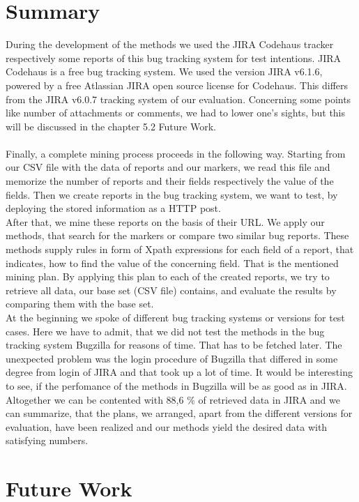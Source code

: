\section{Summary}
\label{Summary}
During the development of the methods we used the JIRA Codehaus tracker respectively some reports of this bug tracking system for test intentions. JIRA Codehaus is a free bug tracking system. We used the version JIRA v6.1.6, powered by a free Atlassian JIRA open source license for Codehaus. This differs from the JIRA v6.0.7 tracking system of our evaluation. Concerning some points like number of attachments or comments, we had to lower one's sights, but this will be discussed in the chapter 5.2 Future Work. \\ \\
Finally, a complete mining process proceeds in the following way.
Starting from our CSV file with the data of reports and our markers, we read this file and memorize the number of reports and their fields respectively the value of the fields. Then we create reports in the bug tracking system, we want to test, by deploying the stored information as a HTTP post. \\ After that, we mine these reports on the basis of their URL. We apply our methods, that search for the markers or compare two similar bug reports. These methods supply rules in form of Xpath expressions for each field of a report, that indicates, how to find the value of the concerning field. That is the mentioned mining plan. By applying this plan to each of the created reports, we try to retrieve all data, our base set (CSV file) contains, and evaluate the results by comparing them with the base set.  
\\ At the beginning we spoke of different bug tracking systems or versions for test cases. Here we have to admit, that we did not test the methods in the bug tracking system Bugzilla for reasons of time. That has to be fetched later. The unexpected problem was the login procedure of Bugzilla that differed in some degree from login of JIRA and that took up a lot of time.   
It would be interesting to see, if the perfomance of the methods in Bugzilla will be as good as in JIRA. \\ Altogether we can be contented with 88,6 \% of retrieved data in JIRA and we can summarize, that the plans, we arranged, apart from the different versions for evaluation, have been realized and our methods yield the desired data with satisfying numbers.

\section{Future Work}
\label{Future Work}
